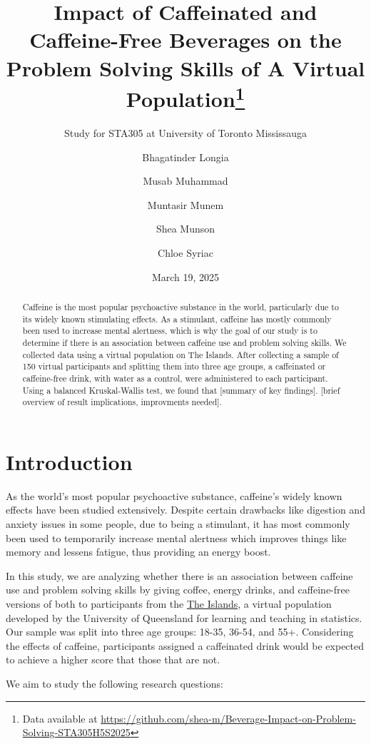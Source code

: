 \documentclass[
  letterpaper,
  DIV=11,
  numbers=noendperiod]{scrartcl}
\title{Impact of Caffeinated and Caffeine-Free Beverages on the Problem
Solving Skills of A Virtual Population\thanks{Data available at
\url{https://github.com/shea-m/Beverage-Impact-on-Problem-Solving-STA305H5S2025}}}
\subtitle{Study for STA305 at University of Toronto Mississauga}
\author{Bhagatinder Longia \and Musab Muhammad \and Muntasir
Munem \and Shea Munson \and Chloe Syriac}
\date{March 19, 2025}
\renewcommand*\contentsname{Table of contents}
\newcommand\contentsname{Table of contents}
\begin{document}
\maketitle
\begin{abstract}
Caffeine is the most popular psychoactive substance in the world,
particularly due to its widely known stimulating effects. As a
stimulant, caffeine has mostly commonly been used to increase mental
alertness, which is why the goal of our study is to determine if there
is an association between caffeine use and problem solving skills. We
collected data using a virtual population on The Islands. After
collecting a sample of 150 virtual participants and splitting them into
three age groups, a caffeinated or caffeine-free drink, with water as a
control, were administered to each participant. Using a balanced
Kruskal-Wallis test, we found that {[}summary of key findings{]}.
{[}brief overview of result implications, improvments needed{]}.
\end{abstract}

\renewcommand*\contentsname{Table of contents}
{
\hypersetup{linkcolor=}
\setcounter{tocdepth}{3}
\tableofcontents
}

\newpage

\section{Introduction}\label{introduction}

As the world's most popular psychoactive substance, caffeine's widely
known effects have been studied extensively. Despite certain drawbacks
like digestion and anxiety issues in some people, due to being a
stimulant, it has most commonly been used to temporarily increase mental
alertness which improves things like memory and lessens fatigue, thus
providing an energy boost.

In this study, we are analyzing whether there is an association between
caffeine use and problem solving skills by giving coffee, energy drinks,
and caffeine-free versions of both to participants from the
\href{https://islands.smp.uq.edu.au/}{The Islands}, a virtual population
developed by the University of Queensland for learning and teaching in
statistics. Our sample was split into three age groups: 18-35, 36-54,
and 55+. Considering the effects of caffeine, participants assigned a
caffeinated drink would be expected to achieve a higher score that those
that are not.

We aim to study the following research questions:
\end{document}
